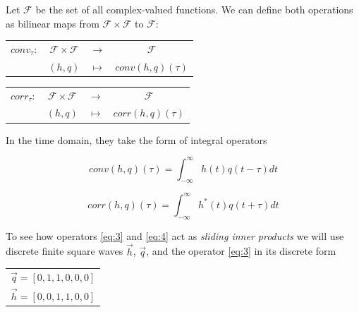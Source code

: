 Let $\mathcal{F}$ be the set of all complex-valued functions. We can define both operations as bilinear maps from $\mathcal{F}\times\mathcal{F}$ to $\mathcal{F}$:

\vspace{1cm}

\begin{center}

\begin{tabular}{cccc}
$conv_\tau:$&$\mathcal{F}\times\mathcal{F}$ & $\rightarrow$ & $\mathcal{F}$ \\
&$(h, q)$ &$\mapsto$ & $conv(h,q)(\tau)$
\end{tabular}

\end{center}

\vspace{1cm}

\begin{center}

\begin{tabular}{cccc}
$corr_\tau:$&$\mathcal{F}\times\mathcal{F}$ & $\rightarrow$ & $\mathcal{F}$ \\
&$(h, q)$ &$\mapsto$ & $corr(h,q)(\tau)$
\end{tabular}

\end{center}

\vspace{1cm}

In the time domain, they take the form of integral operators 

\begin{equation}\label{eq:3}
conv(h, q)(\tau)= \int_{-\infty}^{\infty} h(t)q(t-\tau)dt
\end{equation}


\begin{equation}\label{eq:4}
corr(h, q)(\tau)= \int_{-\infty}^{\infty} h^*(t)q(t+\tau)dt
\end{equation}

To see how operators \ref{eq:3} and \ref{eq:4} act as \textit{sliding inner products} we will use discrete finite square waves $\vec{h}$, $\vec{q}$, and the operator \ref{eq:3} in its discrete form 


\vspace{0.5cm}

\begin{center}

\begin{tabular}{c}
$ \vec{q} = [0,1,1,0,0,0]$ \\
$ \vec{h} = [0,0,1,1,0,0]$

\end{tabular}

\end{center}

